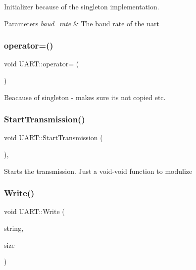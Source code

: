 Initializer because of the singleton implementation. 
\begin{DoxyParams}{Parameters}
{\em baud\+\_\+rate} & The baud rate of the uart \\
\hline
\end{DoxyParams}
\hypertarget{class_u_a_r_t_a843ab7fc20f5ce5f030d2ca5ee98d6b6}{}\label{class_u_a_r_t_a843ab7fc20f5ce5f030d2ca5ee98d6b6} 
\subsubsection{\texorpdfstring{operator=()}{operator=()}}
{\footnotesize\ttfamily void U\+A\+R\+T\+::operator= (\begin{DoxyParamCaption}\item[{const \hyperlink{class_u_a_r_t}{U\+A\+RT} \&}]{ }\end{DoxyParamCaption})\hspace{0.3cm}{\ttfamily [delete]}}

Beacause of singleton -\/ makes sure its not copied etc. \hypertarget{class_u_a_r_t_a0569d0267f8045907cedb527b5082fe0}{}\label{class_u_a_r_t_a0569d0267f8045907cedb527b5082fe0} 
\subsubsection{\texorpdfstring{Start\+Transmission()}{StartTransmission()}}
{\footnotesize\ttfamily void U\+A\+R\+T\+::\+Start\+Transmission (\begin{DoxyParamCaption}{ }\end{DoxyParamCaption})\hspace{0.3cm}{\ttfamily [inline]}, {\ttfamily [private]}}

Starts the transmission. Just a void-\/void function to modulize \hypertarget{class_u_a_r_t_a8bb77ca27b4e17d608d2743313625ac4}{}\label{class_u_a_r_t_a8bb77ca27b4e17d608d2743313625ac4} 
\subsubsection{\texorpdfstring{Write()}{Write()}}
{\footnotesize\ttfamily void U\+A\+R\+T\+::\+Write (\begin{DoxyParamCaption}\item[{uint8\+\_\+t $\ast$}]{string,  }\item[{uint16\+\_\+t}]{size }\end{DoxyParamCaption})\hspace{0.3cm}{\ttfamily [virtual]}}

